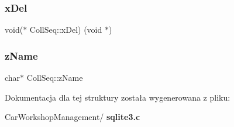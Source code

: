 \mbox{\label{struct_coll_seq_a92c8da8b4021953e5bdc0fd9af077f1f}} 
\subsubsection{xDel}
{\footnotesize\ttfamily void($\ast$ Coll\+Seq\+::x\+Del) (void $\ast$)}

\mbox{\label{struct_coll_seq_a48d6d5f71d4f8a3ab122903464e8b4a1}} 
\subsubsection{zName}
{\footnotesize\ttfamily char$\ast$ Coll\+Seq\+::z\+Name}



Dokumentacja dla tej struktury została wygenerowana z pliku\+:\begin{DoxyCompactItemize}
\item 
Car\+Workshop\+Management/\textbf{ sqlite3.\+c}\end{DoxyCompactItemize}
